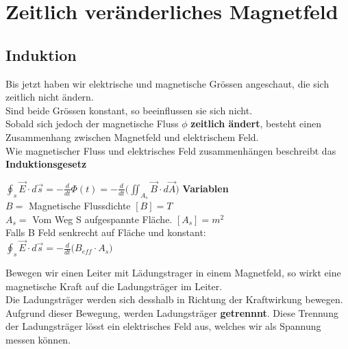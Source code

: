 




\newpage

\section{Zeitlich veränderliches Magnetfeld}

\subsection{Induktion}

Bis jetzt haben wir elektrische und magnetische Grössen angeschaut, die sich zeitlich nicht ändern. \\
Sind beide Grössen konstant, so beeinflussen sie sich nicht. \\
Sobald sich jedoch der magnetische Fluss $\phi$  \textbf{zeitlich ändert}, besteht einen Zusammenhang zwischen Magnetfeld und elektrischem Feld. \\
Wie magnetischer Fluss und elektrisches Feld zusammenhängen beschreibt das \textbf{Induktionsgesetz}


\begingl
\formulaBegin
  $\displaystyle \oint_s \vec{E}\cdot d\vec{s} = -\frac{d}{dt}\Phi(t) =  -\frac{d}{dt} \big ( \iint_{A_s} \vec{B} \cdot d\vec{A} \big )$
\formulaEnd
\textbf{Variablen} \\
$B = $ Magnetische Flussdichte $[B] = T$\\
$A_s = $ Vom Weg S aufgespannte Fläche. $[A_s] = m^2$ \\

Falls B Feld senkrecht auf Fläche und konstant: \\

\formulaBegin
  $\displaystyle  \oint_s \vec{E}\cdot d\vec{s} = -\frac{d}{dt} \big ( B_{eff} \cdot A_s \big ) $
\formulaEnd
\iend


\newpage

Bewegen wir einen Leiter mit Lädungstrager in einem Magnetfeld, so wirkt eine magnetische Kraft auf die Ladungsträger im Leiter. \\
Die Ladungsträger werden sich desshalb in Richtung der Kraftwirkung bewegen. \\
Aufgrund dieser Bewegung, werden Ladungsträger \textbf{getrennnt}. Diese Trennung der Ladungsträger lösst ein elektrisches Feld aus, welches wir als Spannung messen können.


